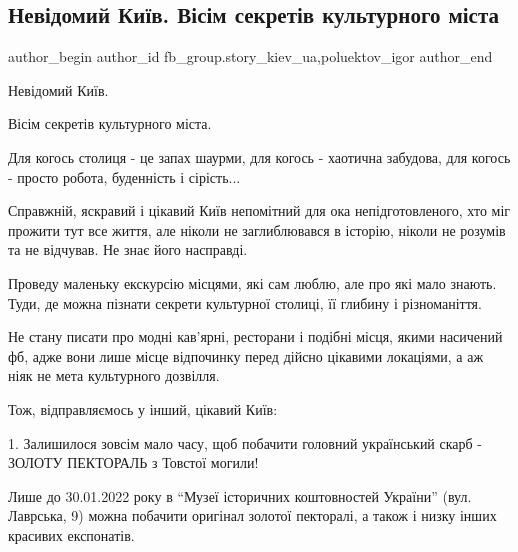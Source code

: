  
 
 
 
 
 
\subsection{Невідомий Київ. Вісім секретів культурного міста}
\label{sec:28_01_2022.fb.fb_group.story_kiev_ua.1.kiev_visim_sekretiv}
 
\ifcmt
 author_begin
   author_id fb_group.story_kiev_ua,poluektov_igor
 author_end
\fi

Невідомий Київ.

Вісім секретів культурного міста.

Для когось столиця - це запах шаурми, для когось - хаотична забудова, для
когось - просто робота, буденність і сірість...

Справжній, яскравий і цікавий Київ непомітний для ока непідготовленого, хто міг
прожити тут все життя, але ніколи не заглиблювався в історію, ніколи не розумів
та не відчував. Не знає його насправді.


Проведу маленьку екскурсію місцями, які сам люблю, але про які мало знають.
Туди, де можна пізнати секрети культурної столиці, її глибину і різноманіття. 

Не стану писати про модні кав’ярні, ресторани і подібні місця, якими насичений
фб, адже вони лише місце відпочинку перед дійсно цікавими локаціями, а аж ніяк
не мета культурного дозвілля. 

Тож, відправляємось у інший, цікавий Київ:

1. Залишилося зовсім мало часу, щоб побачити головний український скарб -
ЗОЛОТУ ПЕКТОРАЛЬ з Товстої могили!

Лише до 30.01.2022 року в \enquote{Музеї історичних коштовностей України}
(вул. Лаврська, 9) можна побачити оригінал золотої пекторалі, а також і низку
інших красивих експонатів. 

